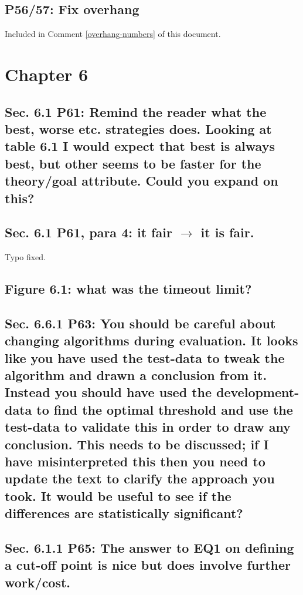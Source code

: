 \documentclass[]{article}
\begin{document}
\subsection{P56/57: Fix overhang}

Included in Comment \ref{overhang-numbers} of this document.

\section{Chapter 6}

\subsection{Sec. 6.1 P61: Remind the reader what the best, worse etc. strategies does. Looking at table 6.1 I would expect that best is always best, but other seems to be faster for the theory/goal attribute. Could you expand on this?}

\subsection{Sec. 6.1 P61, para 4: it fair $\rightarrow$ it is fair.}

Typo fixed.

\subsection{Figure 6.1: what was the timeout limit?}

\subsection{Sec. 6.6.1 P63: You should be careful about changing algorithms during evaluation. It looks like you have used the test-data to tweak the algorithm and drawn a conclusion from it. Instead you should have used the development-data to find the optimal threshold and use the test-data to validate this in order to draw any conclusion. This needs to be discussed; if I have	misinterpreted this then you need to update the text to clarify the approach you took. It would be useful to see if the differences are statistically significant?}

\subsection{Sec. 6.1.1 P65: The answer to EQ1 on defining a cut-off point is nice but does involve further work/cost.}
\end{document}
